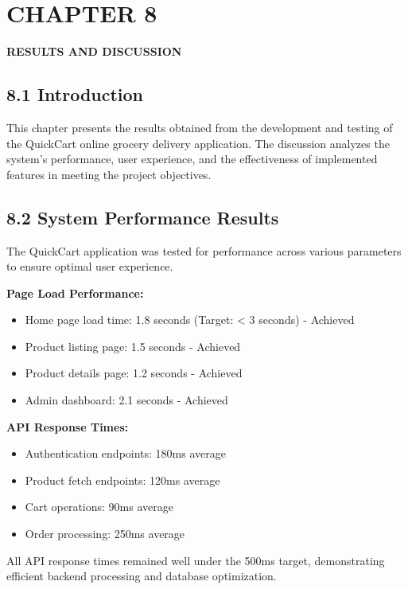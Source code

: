 \documentclass[12pt,a4paper]{report}
\begin{document}
\chapter*{CHAPTER 8}

\begin{center}
    \textbf{\large RESULTS AND DISCUSSION}
\end{center}

\section*{8.1 Introduction}

This chapter presents the results obtained from the development and testing of the QuickCart online grocery delivery application. The discussion analyzes the system's performance, user experience, and the effectiveness of implemented features in meeting the project objectives.

\section*{8.2 System Performance Results}

The QuickCart application was tested for performance across various parameters to ensure optimal user experience.

\textbf{Page Load Performance:}
\begin{itemize}
    \item Home page load time: 1.8 seconds (Target: < 3 seconds) - Achieved
    \item Product listing page: 1.5 seconds - Achieved
    \item Product details page: 1.2 seconds - Achieved
    \item Admin dashboard: 2.1 seconds - Achieved
\end{itemize}

\textbf{API Response Times:}
\begin{itemize}
    \item Authentication endpoints: 180ms average
    \item Product fetch endpoints: 120ms average
    \item Cart operations: 90ms average
    \item Order processing: 250ms average
\end{itemize}

All API response times remained well under the 500ms target, demonstrating efficient backend processing and database optimization.
\end{document}
